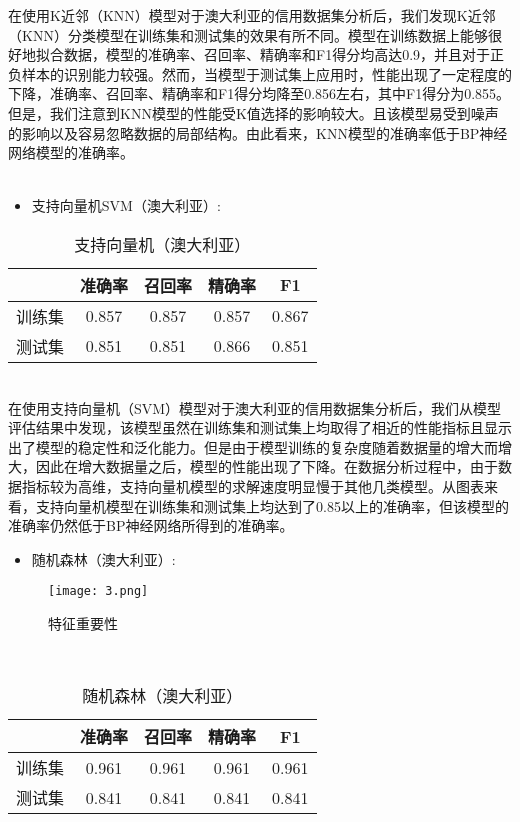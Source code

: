 \documentclass[12pt,a4paper]{nmmcm}
\begin{document}
在使用K近邻（KNN）模型对于澳大利亚的信用数据集分析后，我们发现K近邻（KNN）分类模型在训练集和测试集的效果有所不同。模型在训练数据上能够很好地拟合数据，模型的准确率、召回率、精确率和F1得分均高达0.9，并且对于正负样本的识别能力较强。然而，当模型于测试集上应用时，性能出现了一定程度的下降，准确率、召回率、精确率和F1得分均降至0.856左右，其中F1得分为0.855。但是，我们注意到KNN模型的性能受K值选择的影响较大。且该模型易受到噪声的影响以及容易忽略数据的局部结构。由此看来，KNN模型的准确率低于BP神经网络模型的准确率。
\\
\\
\begin{itemize}
   \item
支持向量机SVM（澳大利亚）:
\end{itemize}
\begin{table}[H]
\centering
 \caption{支持向量机（澳大利亚）}
\begin{tabular}{ccccc}
\hline
 & 准确率   & 召回率   & 精确率   & F1    \\
\hline
训练集   & 0.857 & 0.857& 0.857& 0.867 \\
测试集   & 0.851& 0.851 & 0.866 & 0.851  \\
\hline
\end{tabular}
\end{table}
\\

在使用支持向量机（SVM）模型对于澳大利亚的信用数据集分析后，我们从模型评估结果中发现，该模型虽然在训练集和测试集上均取得了相近的性能指标且显示出了模型的稳定性和泛化能力。但是由于模型训练的复杂度随着数据量的增大而增大，因此在增大数据量之后，模型的性能出现了下降。在数据分析过程中，由于数据指标较为高维，支持向量机模型的求解速度明显慢于其他几类模型。从图表来看，支持向量机模型在训练集和测试集上均达到了0.85以上的准确率，但该模型的准确率仍然低于BP神经网络所得到的准确率。
\\
\begin{itemize}
   \item
随机森林（澳大利亚）:
\end{itemize}
\begin{figure}[H]
    \centering
    \texttt{[image: 3.png]}
    \caption{特征重要性}
    \label{fig:enter-label}
\end{figure}

\\
\begin{table}[H]
\centering
 \caption{随机森林（澳大利亚）}
\begin{tabular}{ccccc}
\hline
 & 准确率   & 召回率   & 精确率   & F1    \\
\hline
训练集   & 0.961 & 0.961& 0.961& 0.961 \\
测试集   & 0.841& 0.841 & 0.841 & 0.841  \\
\hline
\end{tabular}
\end{table}
\end{document}
